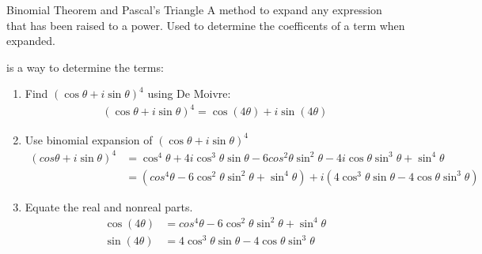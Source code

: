 \documentclass[\main/notes.tex]{subfiles}
\begin{document}
			\begin{theorem}{Binomial Theorem and Pascal's Triangle}
				A method to expand any expression that has been raised to a power. Used to determine the coefficents of a term when expanded.

				 is a way to determine the terms:
					\begin{center}
				\end{center}
			\end{theorem}
			\pagebreak
			\begin{example}
				\begin{enumerate}
					\item Find $(\cos\theta + i\sin\theta)^{4}$ using De Moivre:
						\begin{align*}
							(\cos\theta + i\sin\theta)^{4} = \cos(4\theta) + i\sin(4\theta)
						\end{align*}
					\item Use binomial expansion of $(\cos\theta + i\sin\theta)^{4}$
						\begin{align*}
							(cos\theta + i\sin\theta)^{4} &= \cos^{4}\theta + 4i\cos^{3}\theta\sin\theta - 6cos^{2}\theta\sin^{2}\theta - 4i\cos\theta\sin^{3}\theta + \sin^{4}\theta\\
							&= (cos^{4}\theta - 6\cos^{2}\theta\sin^{2}\theta + \sin^{4}\theta) + i(4\cos^{3}\theta\sin\theta - 4\cos\theta\sin^{3}\theta)
						\end{align*}
					\item Equate the real and nonreal parts.
						\begin{align*}
							\cos(4\theta) &= cos^{4}\theta - 6\cos^{2}\theta\sin^{2}\theta + \sin^{4}\theta\\
							\sin(4\theta) &= 4\cos^{3}\theta\sin\theta - 4\cos\theta\sin^{3}\theta
						\end{align*}
				\end{enumerate}
			\end{example}
\end{document}
